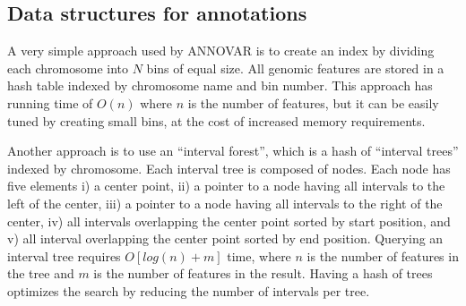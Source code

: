 \subsection{Data structures for annotations}

A very simple approach used by ANNOVAR \cite{wang2010annovar} is to create an index by dividing each chromosome into $N$ bins of equal size. All genomic features are stored in a hash table indexed by chromosome name and bin number. This approach has running time of $O(n)$ where $n$ is the number of features, but it can be easily tuned by creating small bins, at the cost of increased memory requirements.

Another approach \cite{cingolani2012program} is to use an ``interval forest'', which is a hash of ``interval trees'' indexed by chromosome. Each interval tree is composed of nodes. Each node has five elements i) a center point, ii) a pointer to a node having all intervals to the left of the center, iii) a pointer to a node having all intervals to the right of the center, iv) all intervals overlapping the center point sorted by start position, and v) all interval overlapping the center point sorted by end position. Querying an interval tree requires $O[log(n) + m]$ time, where $n$ is the number of features in the tree and $m$ is the number of features in the result. Having a hash of trees optimizes the search by reducing the number of intervals per tree.
